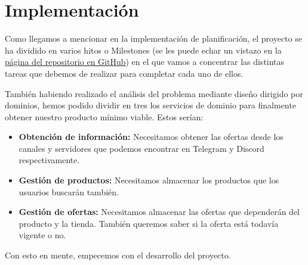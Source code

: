 \chapter{Implementación}

Como llegamos a mencionar en la implementación de planificación, el proyecto se ha 
dividido en varios hitos o Milestones (se les puede echar un vistazo en la 
\href{https://github.com/jero-dev/proyecto-tfg/milestones}{página del repositorio 
en GitHub}) en el que vamos a concentrar las distintas tareas que debemos de 
realizar para completar cada uno de ellos.

También habiendo realizado el análisis del problema mediante diseño dirigido por 
dominios, hemos podido dividir en tres los servicios de dominio para finalmente 
obtener nuestro producto mínimo viable. Estos serían:

\begin{itemize}
    \item \textbf{Obtención de información:} Necesitamos obtener las ofertas desde 
    los canales y servidores que podemos encontrar en Telegram y Discord 
    respectivamente.
    \item \textbf{Gestión de productos:} Necesitamos almacenar los productos que 
    los usuarios buscarán también.
    \item \textbf{Gestión de ofertas:} Necesitamos almacenar las ofertas que 
    dependerán del producto y la tienda. También queremos saber si la oferta está
    todavía vigente o no.
\end{itemize}

Con esto en mente, empecemos con el desarrollo del proyecto.
